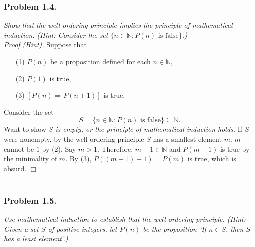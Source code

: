 \documentclass{article}
\begin{document}



\subsubsection*{Problem 1.4.}
\emph{Show that the well-ordering principle implies
the principle of mathematical induction.
(Hint: Consider the set $\{ n \in \mathbb{N} : P(n) \text{ is false} \}$.)} \\

\emph{Proof (Hint).}
Suppose that
\begin{enumerate}
\item[(1)]
$P(n)$ be a proposition defined for each $n \in \mathbb{N}$,
\item[(2)]
$P(1)$ is true,
\item[(3)]
$[P(n) \Rightarrow P(n+1)]$ is true.
\end{enumerate}

Consider the set
$$S = \{ n \in \mathbb{N} : P(n) \text{ is false} \} \subseteq \mathbb{N}.$$
Want to show
\emph{$S$ is empty, or the principle of mathematical induction holds.}
If $S$ were nonempty,
by the well-ordering principle $S$ has a smallest element $m$.
$m$ cannot be $1$ by (2).
Say $m > 1$.
Therefore, $m - 1 \in \mathbb{N}$
and $P(m-1)$ is true by the minimality of $m$.
By (3), $P((m-1)+1) = P(m)$ is true, which is absurd.
$\Box$ \\\\






\subsubsection*{Problem 1.5.}
\emph{Use mathematical induction to establish
that the well-ordering principle.
(Hint: Given a set $S$ of positive integers,
let $P(n)$ be the proposition
`If $n \in S$, then $S$ has a least element'.)} \\
\end{document}
